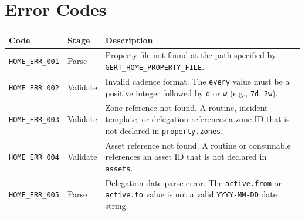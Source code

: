 \section{Error Codes}
\label{sec:ref-error-codes}

\begin{center}
\small
\begin{tabular}{llp{7cm}}
\textbf{Code} & \textbf{Stage} & \textbf{Description} \\
\hline
\texttt{HOME\_ERR\_001} & Parse & Property file not found at the path specified by
                                  \texttt{GERT\_HOME\_PROPERTY\_FILE}. \\
\texttt{HOME\_ERR\_002} & Validate & Invalid cadence format. The \texttt{every} value must
                                     be a positive integer followed by \texttt{d} or \texttt{w}
                                     (e.g., \texttt{7d}, \texttt{2w}). \\
\texttt{HOME\_ERR\_003} & Validate & Zone reference not found. A routine, incident template,
                                     or delegation references a zone ID that is not declared
                                     in \texttt{property.zones}. \\
\texttt{HOME\_ERR\_004} & Validate & Asset reference not found. A routine or consumable
                                     references an asset ID that is not declared in
                                     \texttt{assets}. \\
\texttt{HOME\_ERR\_005} & Parse & Delegation date parse error. The \texttt{active.from}
                                  or \texttt{active.to} value is not a valid \texttt{YYYY-MM-DD}
                                  date string. \\
\end{tabular}
\end{center}
